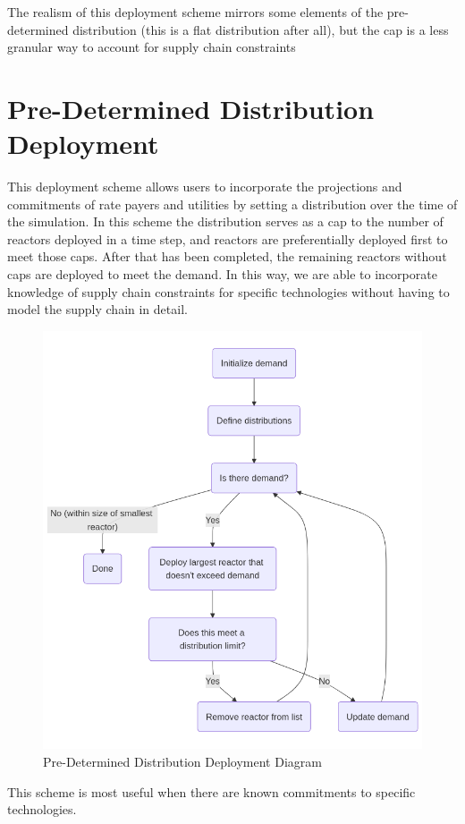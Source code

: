 The realism of this deployment scheme mirrors some elements of the pre-determined distribution (this is a flat distribution after all), but the cap is a less granular way to account for supply chain constraints


\section{Pre-Determined Distribution Deployment}
This deployment scheme allows users to incorporate the projections and
commitments of rate payers and utilities by setting a distribution over the
time of the simulation. In this scheme the distribution serves as a cap to the
number of reactors deployed in a time step, and reactors are preferentially
deployed first to meet those caps. After that has been completed, the remaining
reactors without caps are deployed to meet the demand. In this way, we are able
to incorporate knowledge of supply chain constraints for specific technologies
without having to model the supply chain in detail.

\begin{figure}[!htbp]
    \centering
    \includegraphics[scale=0.4]{images/schemes/pre_det_diagram.png}
    \caption{Pre-Determined Distribution Deployment Diagram}
    \label{fig:pre_det_diagram}
\end{figure}


This scheme is most useful when there are known commitments to specific technologies.